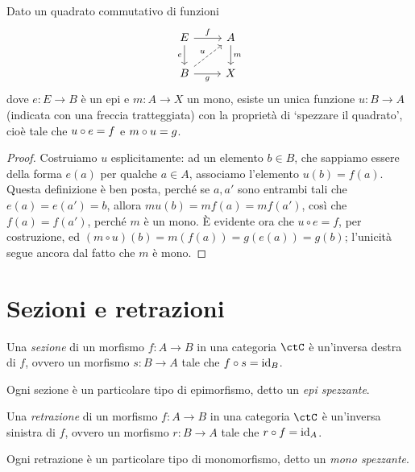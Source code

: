 \begin{proposition}
	Dato un quadrato commutativo di funzioni
	\[\begin{tikzcd}
			E \ar[r,"f"]\ar[d, "e"']& A\ar[d, "m"] \\
			B \ar[r, "g"']\ar[ur,dashed,"u"] & X
		\end{tikzcd}\]
	dove \(e : E\to B\) è un epi e \(m : A \to X\) un mono, esiste un unica funzione \(u : B\to A\) (indicata con una freccia tratteggiata) con la proprietà di `spezzare il quadrato', cioè tale che \(u\circ e=f\) e \(m\circ u=g\).
\end{proposition}
\begin{proof}
	Costruiamo \(u\) esplicitamente: ad un elemento \(b\in B\), che sappiamo essere della forma \(e(a)\) per qualche \(a\in A\), associamo l'elemento \(u(b)=f(a)\). Questa definizione è ben posta, perché se \(a,a'\) sono entrambi tali che \(e(a)=e(a')=b\), allora \(mu(b)=mf(a)=mf(a')\), così che \(f(a)=f(a')\), perché \(m\) è un mono. \`E evidente ora che \(u\circ e= f\), per costruzione, ed \((m\circ u)(b)=m(f(a))=g(e(a))=g(b)\); l'unicità segue ancora dal fatto che \(m\) è mono.
\end{proof}
\section{Sezioni e retrazioni}

\begin{definition}[Sezione]
	Una \emph{sezione} di un morfismo \(f \colon A \to B\) in una categoria \(\ctC\) è un'inversa destra di \(f\), ovvero un morfismo \(s \colon B \to A\) tale che \(f \circ s = \mathrm{id}_{B}\).
\end{definition}
Ogni sezione è un particolare tipo di epimorfismo, detto un \emph{epi spezzante}.
\begin{definition}[Retrazione]
	Una \emph{retrazione} di un morfismo \(f \colon A \to B\) in una categoria \(\ctC\) è un'inversa sinistra di \(f\), ovvero un morfismo \(r \colon B \to A\) tale che \(r \circ f = \mathrm{id}_{A}\).
\end{definition}
Ogni retrazione è un particolare tipo di monomorfismo, detto un \emph{mono spezzante}.
